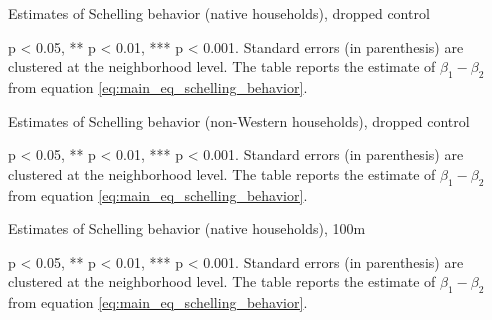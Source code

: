 \documentclass[../main.tex]{subfiles}
\begin{document}
\begin{table}[H]
    \centering
    \caption{Estimates of Schelling behavior (native households), dropped control}
    \label{tab:main_results_robust_I_control_full}
    \begin{threeparttable}
            
    \begin{tablenotes}[flushleft]
    \item \scriptsize * p < 0.05, ** p < 0.01, *** p < 0.001. Standard errors (in parenthesis) are clustered at the neighborhood level. The table reports the estimate of $\beta_1 - \beta_2$ from equation \ref{eq:main_eq_schelling_behavior}. 
    \end{tablenotes}
    \end{threeparttable}
\end{table}

\begin{table}[H]
    \centering
    \caption{Estimates of Schelling behavior (non-Western households), dropped control}
    \label{tab:main_results_robust_I_control_non_west_full}
    \begin{threeparttable}
            
    \begin{tablenotes}[flushleft]
    \item \scriptsize * p < 0.05, ** p < 0.01, *** p < 0.001. Standard errors (in parenthesis) are clustered at the neighborhood level. The table reports the estimate of $\beta_1 - \beta_2$ from equation \ref{eq:main_eq_schelling_behavior}. 
    \end{tablenotes}
    \end{threeparttable}
\end{table}

\begin{table}[H]
    \centering
    \caption{Estimates of Schelling behavior (native households), 100m}
    \label{tab:main_results_full_100m}
    \begin{threeparttable}
            
    \begin{tablenotes}[flushleft]
    \item \scriptsize * p < 0.05, ** p < 0.01, *** p < 0.001. Standard errors (in parenthesis) are clustered at the neighborhood level. The table reports the estimate of $\beta_1 - \beta_2$ from equation \ref{eq:main_eq_schelling_behavior}. 
    \end{tablenotes}
    \end{threeparttable}
\end{table}
\end{document}
